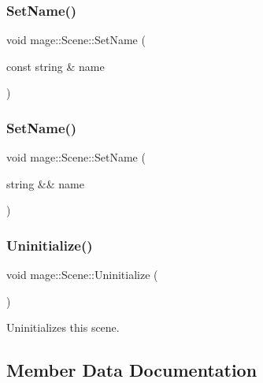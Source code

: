\hypertarget{classmage_1_1_scene_a9b7c1c2f84cc3b3c5ff3de4f29d830e9}{}\label{classmage_1_1_scene_a9b7c1c2f84cc3b3c5ff3de4f29d830e9} 
\subsubsection{\texorpdfstring{Set\+Name()}{SetName()}\hspace{0.1cm}{\footnotesize\ttfamily [1/2]}}
{\footnotesize\ttfamily void mage\+::\+Scene\+::\+Set\+Name (\begin{DoxyParamCaption}\item[{const string \&}]{name }\end{DoxyParamCaption})}

\hypertarget{classmage_1_1_scene_a86b2e6e764ee134af1706f90603a6596}{}\label{classmage_1_1_scene_a86b2e6e764ee134af1706f90603a6596} 
\subsubsection{\texorpdfstring{Set\+Name()}{SetName()}\hspace{0.1cm}{\footnotesize\ttfamily [2/2]}}
{\footnotesize\ttfamily void mage\+::\+Scene\+::\+Set\+Name (\begin{DoxyParamCaption}\item[{string \&\&}]{name }\end{DoxyParamCaption})\hspace{0.3cm}{\ttfamily [noexcept]}}

\hypertarget{classmage_1_1_scene_a714dc33c04dc2b8e2cec93564905b174}{}\label{classmage_1_1_scene_a714dc33c04dc2b8e2cec93564905b174} 
\subsubsection{\texorpdfstring{Uninitialize()}{Uninitialize()}}
{\footnotesize\ttfamily void mage\+::\+Scene\+::\+Uninitialize (\begin{DoxyParamCaption}{ }\end{DoxyParamCaption})}

Uninitializes this scene. 

\subsection{Member Data Documentation}
\hypertarget{classmage_1_1_scene_a0ce9718f4b0137a52b858a29d3504328}{}\label{classmage_1_1_scene_a0ce9718f4b0137a52b858a29d3504328} 
